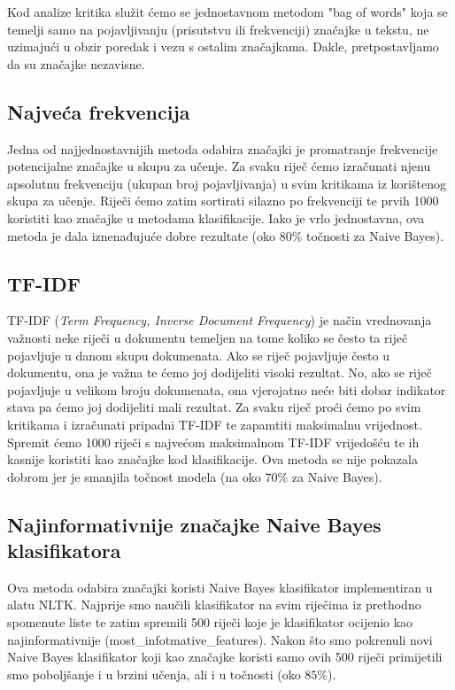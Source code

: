 \documentclass[conference]{IEEEtran}
\begin{document}
Kod analize kritika služit ćemo se jednostavnom metodom "bag of words" koja se temelji samo na pojavljivanju (prisutstvu ili frekvenciji) značajke u tekstu, ne uzimajući u obzir poredak i vezu s ostalim značajkama. Dakle, pretpostavljamo da su značajke nezavisne.

\subsection{Najveća frekvencija}

Jedna od najjednostavnijih metoda odabira značajki je promatranje frekvencije potencijalne značajke u skupu za učenje. Za svaku riječ ćemo izračunati njenu apsolutnu frekvenciju (ukupan broj pojavljivanja) u svim kritikama iz korištenog skupa za učenje. Riječi ćemo zatim sortirati silazno po frekvenciji te prvih 1000 koristiti kao značajke u metodama klasifikacije. Iako je vrlo jednostavna, ova metoda je dala iznenađujuće dobre rezultate (oko $80\%$ točnosti za Naive Bayes).

\subsection{TF-IDF}

TF-IDF (\textit{Term Frequency, Inverse Document Frequency}) je način vrednovanja važnosti neke riječi u dokumentu temeljen na tome koliko se često ta riječ pojavljuje u danom skupu dokumenata. Ako se riječ pojavljuje često u dokumentu, ona je važna te ćemo joj dodijeliti visoki rezultat. No, ako se riječ pojavljuje u velikom broju dokumenata, ona vjerojatno neće biti dobar indikator stava pa ćemo joj dodijeliti mali rezultat. Za svaku riječ proći ćemo po svim kritikama i izračunati pripadni TF-IDF te zapamtiti maksimalnu vrijednost. Spremit ćemo 1000 riječi s najvećom maksimalnom TF-IDF vrijedošću te ih kasnije koristiti kao značajke kod klasifikacije. Ova metoda se nije pokazala dobrom jer je smanjila točnost modela (na oko $70\%$ za Naive Bayes).

\subsection{Najinformativnije značajke Naive Bayes klasifikatora}

Ova metoda odabira značajki koristi Naive Bayes klasifikator implementiran u alatu NLTK. Najprije smo naučili klasifikator na svim riječima iz prethodno spomenute liste te zatim spremili 500 riječi koje je klasifikator ocijenio kao najinformativnije (most\_infotmative\_features). Nakon što smo pokrenuli novi Naive Bayes klasifikator koji kao značajke koristi samo ovih 500 riječi primijetili smo poboljšanje i u brzini učenja, ali i u točnosti (oko $85\%$).
\end{document}
